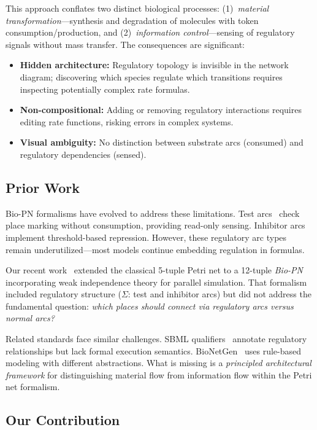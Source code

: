 \documentclass[twocolumn,10pt]{article}
\newcommand{\biopn}{\textit{Bio-PN}}
\begin{document}
This approach conflates two distinct biological processes: (1)~\textit{material transformation}---synthesis and degradation of molecules with token consumption/production, and (2)~\textit{information control}---sensing of regulatory signals without mass transfer. The consequences are significant:

\begin{itemize}
\item \textbf{Hidden architecture:} Regulatory topology is invisible in the network diagram; discovering which species regulate which transitions requires inspecting potentially complex rate formulas.
\item \textbf{Non-compositional:} Adding or removing regulatory interactions requires editing rate functions, risking errors in complex systems.
\item \textbf{Visual ambiguity:} No distinction between substrate arcs (consumed) and regulatory dependencies (sensed).
\end{itemize}

\subsection{Prior Work}

Bio-PN formalisms have evolved to address these limitations. Test arcs~\cite{chaouiya2007petri} check place marking without consumption, providing read-only sensing. Inhibitor arcs implement threshold-based repression. However, these regulatory arc types remain underutilized---most models continue embedding regulation in formulas.

Our recent work~\cite{simao2025weak} extended the classical 5-tuple Petri net to a 12-tuple \biopn{} incorporating weak independence theory for parallel simulation. That formalism included regulatory structure ($\Sigma$: test and inhibitor arcs) but did not address the fundamental question: \textit{which places should connect via regulatory arcs versus normal arcs?}

Related standards face similar challenges. SBML qualifiers~\cite{hucka2003sbml,lenovere2009sbgn} annotate regulatory relationships but lack formal execution semantics. BioNetGen~\cite{blinov2004bionetgen} uses rule-based modeling with different abstractions. What is missing is a \textit{principled architectural framework} for distinguishing material flow from information flow within the Petri net formalism.

\subsection{Our Contribution}
\end{document}
